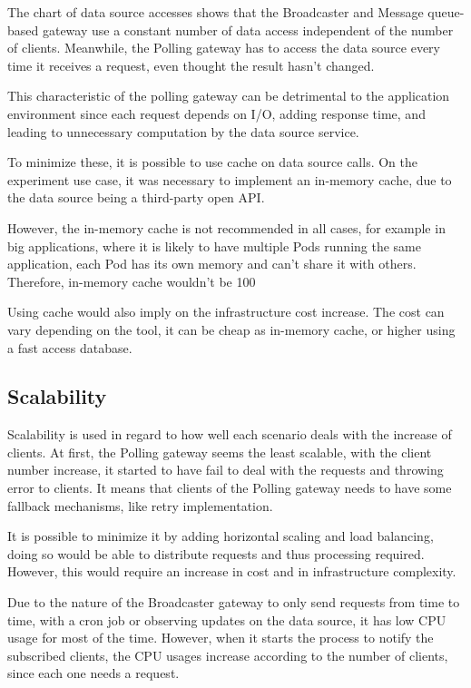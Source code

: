 The chart of data source accesses shows that the Broadcaster and Message queue-based gateway use a constant number of data access independent of the number of clients. Meanwhile, the Polling gateway has to access the data source every time it receives a request, even thought the result hasn’t changed.

This characteristic of the polling gateway can be detrimental to the application environment since each request depends on I/O, adding response time, and leading to unnecessary computation by the data source service.

To minimize these, it is possible to use cache on data source calls. On the experiment use case, it was necessary to implement an in-memory cache, due to the data source being a third-party open API. 

However, the in-memory cache is not recommended in all cases, for example in big applications, where it is likely to have multiple Pods running the same application, each Pod has its own memory and can't share it with others. Therefore, in-memory cache wouldn't be 100%

Using cache would also imply on the infrastructure cost increase. The cost can vary depending on the tool, it can be cheap as in-memory cache, or higher using a fast access database.

\subsection*{Scalability}
\label{sec:scala}

Scalability is used in regard to how well each scenario deals with the increase of clients. At first, the Polling gateway seems the least scalable, with the client number increase, it started to have fail to deal with the requests and throwing error to clients. It means that clients of the Polling gateway needs to have some fallback mechanisms, like retry implementation.

It is possible to minimize it by adding horizontal scaling and load balancing, doing so would be able to distribute requests and thus processing required. However, this would require an increase in cost and in infrastructure complexity.

Due to the nature of the Broadcaster gateway to only send requests from time to time, with a cron job or observing updates on the data source, it has low CPU usage for most of the time. However, when it starts the process to notify the subscribed clients, the CPU usages increase according to the number of clients, since each one needs a request.

